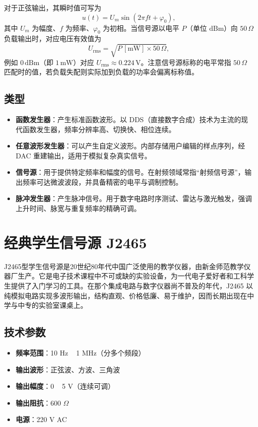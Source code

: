 对于正弦输出，其瞬时值可写为
\[
    u(t) = U_m \sin(2\pi f t + \varphi_0) ,
\]
其中 $U_m$ 为幅度、$f$ 为频率、$\varphi_0$ 为初相。当信号源以电平 $P$（单位 $\mathrm{dBm}$）向 $50\,\Omega$ 负载输出时，对应电压有效值为
\[
    U_{\mathrm{rms}} = \sqrt{P\,\left[\mathrm{mW}\right] \times 50\,\Omega} ,
\]
例如 $0\,\mathrm{dBm}$（即 $1\,\mathrm{mW}$）对应 $U_{\mathrm{rms}} \approx 0.224\,\mathrm{V}$。注意信号源标称的电平常指 $50\,\Omega$ 匹配时的值，若负载失配则实际加到负载的功率会偏离标称值。

\subsection{类型}

\begin{itemize}
    \item \textbf{函数发生器}：产生标准函数波形。以 DDS（直接数字合成）技术为主流的现代函数发生器，频率分辨率高、切换快、相位连续。
    \item \textbf{任意波形发生器}：可以产生自定义波形。内部存储用户编辑的样点序列，经 DAC 重建输出，适用于模拟复杂真实信号。
    \item \textbf{信号源}：用于提供特定频率和幅度的信号。在射频领域常指“射频信号源”，输出频率可达微波波段，并具备精密的电平与调制控制。
    \item \textbf{脉冲发生器}：产生脉冲信号。用于数字电路时序测试、雷达与激光触发，强调上升时间、脉宽与重复频率的精确可调。
\end{itemize}

\section{经典学生信号源 J2465}
\label{sec:student_signal_source}

J2465型学生信号源是20世纪80年代中国广泛使用的教学仪器，由新金师范教学仪器厂生产。它是电子技术课程中不可或缺的实验设备，为一代电子爱好者和工科学生提供了入门学习的工具。在那个集成电路与数字仪器尚不普及的年代，J2465 以纯模拟电路实现多波形输出，结构直观、价格低廉、易于维护，因而长期出现在中学与中专的实验室课桌上。

\subsection{技术参数}

\begin{itemize}
    \item \textbf{频率范围}：10 Hz ~ 1 MHz（分多个频段）
    \item \textbf{输出波形}：正弦波、方波、三角波
    \item \textbf{输出幅度}：0 ~ 5 V（连续可调）
    \item \textbf{输出阻抗}：600 $\Omega$
    \item \textbf{电源}：220 V AC
\end{itemize}

